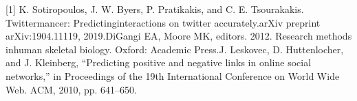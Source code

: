 \documentclass[12pt,oneside]{book}
\begin{document}
% 

%





\tableofcontents
\listoffigures




\mainmatter





%





 
[1] K. Sotiropoulos, J. W. Byers, P. Pratikakis, and C. E. Tsourakakis. Twittermancer: Predictinginteractions on twitter accurately.arXiv preprint arXiv:1904.11119, 2019.\newline
[2] DiGangi EA, Moore MK, editors. 2012. Research methods inhuman skeletal biology. Oxford: Academic Press.\newline
[3] J. Leskovec, D. Huttenlocher, and J. Kleinberg, “Predicting positive and negative links in online social networks,” in Proceedings of the 19th International Conference on World Wide Web. ACM, 2010, pp. 641–650.

%
%
\end{document}
